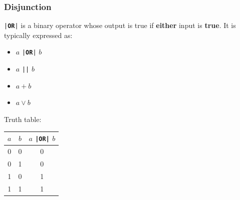 \documentclass{article}
\newcommand{\keyword}[1]{\textcolor[rgb]{0.00,0.50,0.00}{\textbf{#1}}}
\begin{document}
\subsubsection{Disjunction}
\texttt{|\keyword{OR}|} is a binary operator whose output is true if \textbf{either} input is \textbf{true}.
It is typically expressed as:
\begin{itemize}
    \item \(a\) \texttt{|\keyword{OR}|} \(b\)
    \item \(a\) \texttt{|\vert|} \(b\)
    \item \(a + b\)
    \item \(a \lor b\)
\end{itemize}
Truth table:
\begin{table}[H]
    \centering
    \begin{tabular}{c c c}
        \toprule
        \textbf{\(a\)} & \textbf{\(b\)} & \(a\) \texttt{|\keyword{OR}|} \(b\) \\
        \midrule
        0              & 0              & 0                                             \\
        0              & 1              & 0                                             \\
        1              & 0              & 1                                             \\
        1              & 1              & 1                                             \\
        \bottomrule
    \end{tabular}
\end{table}
\end{document}
